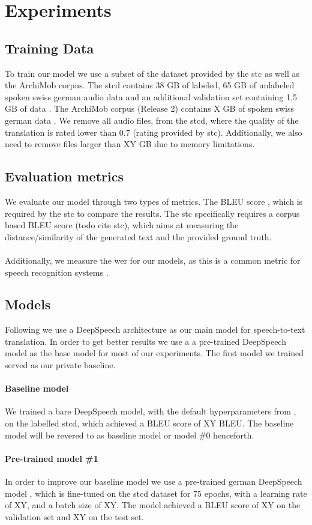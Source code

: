 \section{Experiments}

\subsection{Training Data}
To train our model we use a subset of the dataset provided by the \gls{stc} as well as the ArchiMob corpus. The \gls{stcd} contains 38 GB of labeled, 65 GB of unlabeled spoken swiss german audio data and an additional validation set
containing 1.5 GB of data \cite{stc2019}. The ArchiMob corpus (Release 2) contains X GB of spoken swiss german data \cite{archimob2016}. We remove all audio files, from the \gls{stcd}, where the quality of the translation
is rated lower than 0.7 (rating provided by \gls{stc}). Additionally, we also need to remove files larger than XY GB due to memory limitations.

\subsection{Evaluation metrics}
We evaluate our model through two types of metrics. The BLEU score \cite{Papineni2002BleuAM}, which is required by the \gls{stc} to compare the results. The \gls{stc} specifically requires a corpus
based BLEU score (todo cite stc), which aims at measuring the distance/similarity of the generated text and the provided ground truth.\\~\\Additionally, we measure the \gls{wer} for our models, as
this is a common metric for speech recognition systems \cite{Park2008AnEA}.


\subsection{Models}
Following  we use a DeepSpeech architecture \cite{Hannun2014DeepSS} as our main model for speech-to-text translation. In order to get better results we use a
a pre-trained DeepSpeech model \cite{DeepSpeechGerman090} as the base model for most of our experiments. The first model we trained served as our private baseline. \paragraph{Baseline model} We trained a bare DeepSpeech model,
with the default hyperparameters from ,
on the labelled \gls{stcd}, which achieved a BLEU score of XY BLEU. The baseline model will be revered to as baseline model or model \#0 henceforth.\paragraph{Pre-trained model \#1} In order to improve our baseline model we use a pre-trained
german DeepSpeech model \cite{DeepSpeechGerman090}, which is fine-tuned on the \gls{stcd} dataset for 75 epochs, with a learning rate of XY, and a batch size of XY. The model achieved a BLEU score of
XY on the validation set and XY on the test set.
